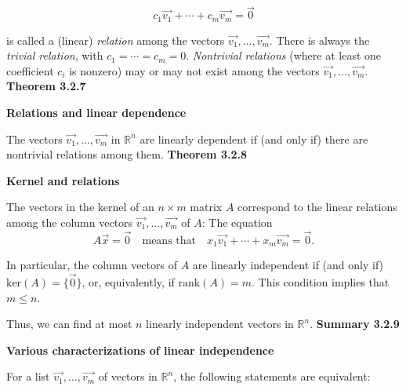 \[c_{1}\vec{v_{1}}+\cdots{}+c_{m}\vec{v_{m}}=\vec{0}\]
\par\noindent is called a (linear) \textit{relation} among the vectors $\vec{v_{1}},\ldots{},\vec{v_{m}}$. There is always the \textit{trivial relation}, with $c_{1}=\cdots{}=c_{m}=0$. \textit{Nontrivial relations} (where at least one coefficient $c_{i}$ is nonzero) may or may not exist among the vectors $\vec{v_{1}},\ldots{},\vec{v_{m}}$.
\textbf{Theorem 3.2.7}\\
\par\noindent\textbf{Relations and linear dependence}
\par\noindent The vectors $\vec{v_{1}},\ldots{},\vec{v_{m}}$ in $\mathbb{R}^{n}$ are linearly dependent if (and only if) there are nontrivial relations among them.
\textbf{Theorem 3.2.8}\\
\par\noindent\textbf{Kernel and relations}
\par\noindent The vectors in the kernel of an $n\times{}m$ matrix $A$ correspond to the linear relations among the column vectors $\vec{v_{1}},\ldots{},\vec{v_{m}}$ of $A$: The equation
\[A\vec{x}=\vec{0}\quad\textrm{means that}\quad{}x_{1}\vec{v_{1}}+\cdots{}+x_{m}\vec{v_{m}}=\vec{0}.\]
\par\noindent In particular, the column vectors of $A$ are linearly independent if (and only if) $\textrm{ker}(A)=\{\vec{0}\}$, or, equivalently, if $\textrm{rank}(A)=m$. This condition implies that $m\le{}n$.
\par\noindent Thus, we can find at most $n$ linearly independent vectors in $\mathbb{R}^{n}$.
\textbf{Summary 3.2.9}\\
\par\noindent\textbf{Various characterizations of linear independence}
\par\noindent For a list $\vec{v_{1}},\ldots{},\vec{v_{m}}$ of vectors in $\mathbb{R}^{n}$, the following statements are equivalent:
\renewcommand{\labelenumi}{\textbf{\roman{enumi}.}}
